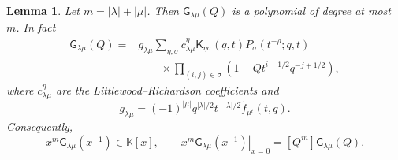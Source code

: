 \documentclass{amsart}
\newtheorem{lemma}{Lemma}
\theoremstyle{definition}
\numberwithin{equation}{section}
\newcommand{\K}{\mathbb K}
\begin{document}
\begin{lemma}\label{lem:two-leg-polynomiality}
Let \(m=|\lambda|+|\mu|\).  Then \(\mathsf G_{\lambda\mu}(Q)\) is a polynomial of degree at most \(m\).  In fact
\begin{equation}
\begin{aligned}
 \mathsf G_{\lambda\mu}(Q)
 ={}&g_{\lambda\mu}
 \sum_{\eta,\sigma}
 c_{\lambda\mu}^{\eta}
 \mathsf K_{\eta\sigma}(q,t)P_\sigma(t^{-\rho};q,t)\\
 &\qquad\times
 \prod_{(i,j)\in\sigma}
 \left(1-Qt^{i-1/2}q^{-j+1/2}\right),
\end{aligned}
\label{eq:two-leg-Macdonald}
\end{equation}
where \(c_{\lambda\mu}^{\eta}\) are the Littlewood--Richardson coefficients and
\begin{equation}
 g_{\lambda\mu}
 =(-1)^{|\mu|}
 q^{|\lambda|/2}t^{-|\lambda|/2}
 \widetilde f_{\mu^t}(t,q).
\label{eq:g-lambda-mu}
\end{equation}
Consequently,
\begin{equation}
 x^m\mathsf G_{\lambda\mu}(x^{-1})\in\K[x],
 \qquad
 \left.x^m\mathsf G_{\lambda\mu}(x^{-1})\right|_{x=0}
 =[Q^m]\mathsf G_{\lambda\mu}(Q).
\label{eq:two-leg-leading-coefficient}
\end{equation}
\end{lemma}
\end{document}
